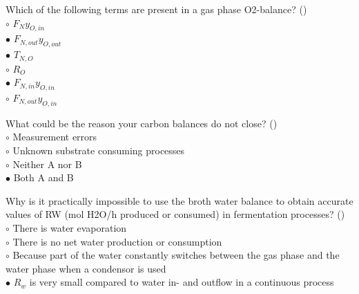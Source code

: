 \documentclass[]{beamer}
\begin{document}
\begin{frame}[shrink] {}
\addtocounter{answers}{1}
\color{blue}
Which of the following terms are present in a gas phase O2-balance?  ()\\
\color{black}
\setlength{\parindent}{-0.4cm}
{\color{red}$\circ$}   $F_{N}y_{O,in}$\\   
{\color{red}$\bullet$}   $F_{N,out}y_{O,out}$\\   
{\color{red}$\bullet$} $T_{N,O}$\\
{\color{red}$\circ$} $R_O$\\
{\color{red}$\bullet$}   $F_{N,in}y_{O,in}$  \\ 
{\color{red}$\circ$}   $F_{N,out}y_{O,in}$   
\end{frame}

\begin{frame}[shrink] {}
\addtocounter{answers}{1}
\color{blue}
What could be the reason your carbon balances do not close?  ()\\
\color{black}
\setlength{\parindent}{-0.4cm}
{\color{red}$\circ$}    Measurement errors\\
{\color{red}$\circ$} Unknown substrate consuming processes\\
{\color{red}$\circ$} Neither A nor B \\
{\color{red}$\bullet$} Both A and B   \\
\end{frame}

\begin{frame}[shrink] {}
\addtocounter{answers}{1}
\color{blue}
Why is it practically impossible to use the broth water balance to obtain accurate values of RW (mol H2O/h produced or consumed) in fermentation processes?  ()\\
\color{black}
\setlength{\parindent}{-0.4cm}
{\color{red}$\circ$}    There is water evaporation\\
{\color{red}$\circ$} There is no net water production or consumption  \\
{\color{red}$\circ$} Because part of the water constantly switches between the gas phase and the water phase when a condensor is used \\
{\color{red}$\bullet$} $R_w$ is very small compared to water in- and outflow in a continuous process   
\end{frame}
\end{document}
